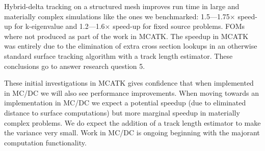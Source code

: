 Hybrid-delta tracking on a structured mesh improves run time in large and materially complex simulations like the ones we benchmarked: 1.5---1.75$\times$ speed-up for k-eigenvalue and 1.2---1.6$\times$ speed-up for fixed source problems.
FOMs where not produced as part of the work in MCATK.
The speedup in MCATK was entirely due to the elimination of extra cross section lookups in an otherwise standard surface tracking algorithm with a track length estimator.
These conclusions go to answer research question 5.

These initial investigations in MCATK gives confidence that when implemented in MC/DC we will also see performance improvements.
When moving towards an implementation in MC/DC we expect a potential speedup (due to eliminated distance to surface computations) but more marginal speedup in materially complex problems.
We do expect the addition of a track length estimator to make the variance very small.
Work in MC/DC is ongoing beginning with the majorant computation functionality.